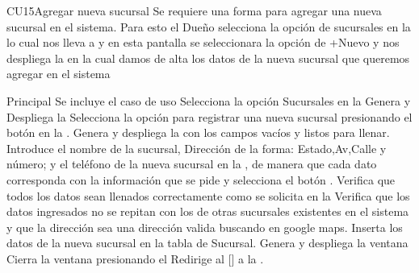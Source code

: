 \begin{UseCase}{CU15}{Agregar nueva sucursal}{
		Se requiere una forma para agregar una nueva sucursal en el sistema. Para esto el Dueño selecciona la opción de sucursales en la  lo cual nos lleva a  y en esta pantalla se seleccionara la opción de +Nuevo y nos despliega la   en la cual damos de alta los datos de la nueva sucursal que queremos agregar en el sistema
	}
	\end{UseCase}




	\begin{UCtrayectoria}{Principal}
		\UCpaso Se incluye el caso de uso 
		\UCpaso[\UCactor] Selecciona la opción Sucursales en la  
		\UCpaso Genera y Despliega la 
		\UCpaso[\UCactor] Selecciona la opción para registrar una nueva sucursal presionando el botón  en la .
		\UCpaso Genera y despliega la  con los campos vacíos y listos para llenar. 
		\UCpaso[\UCactor] Introduce el nombre de la sucursal, Dirección de la forma: Estado,Av,Calle y número; y el teléfono de la nueva sucursal en la , de manera que cada dato corresponda con la información que se pide y selecciona el  botón  .   
		\UCpaso Verifica que todos los datos sean llenados correctamente como se solicita en la 
		\UCpaso Verifica que los datos ingresados no se repitan con los de otras sucursales existentes en el sistema y que la dirección sea una dirección valida buscando en google maps.  
		\UCpaso Inserta los datos de la nueva sucursal en la tabla de Sucursal. 
		\UCpaso Genera y despliega la ventana  
		\UCpaso [\UCactor] Cierra la ventana presionando el 
		\UCpaso Redirige al [\UCactor] a la  .
	\end{UCtrayectoria}


